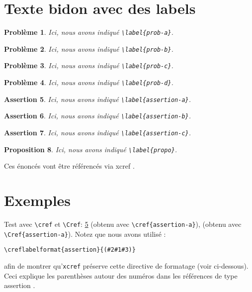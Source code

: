 \documentclass[french]{article}
\newtheorem{problem}{Problème}
\newtheorem{assertion}[problem]{Assertion}
\newtheorem{proposition}[problem]{Proposition}
\let\fxcref=\xcreffrenchwrapper
\begin{document}
\section{Texte bidon avec des labels}

\begin{problem}\label{prob-a}
Ici, nous avons indiqué \verb|\label{prob-a}|.
\end{problem}
\begin{problem}\label{prob-b}
Ici, nous avons indiqué \verb|\label{prob-b}|.
\end{problem}
\begin{problem}\label{prob-c}
Ici, nous avons indiqué \verb|\label{prob-c}|.
\end{problem}
\begin{problem}\label{prob-d}
Ici, nous avons indiqué \verb|\label{prob-d}|.
\end{problem}
\begin{assertion}\label{assertion-a}
Ici, nous avons indiqué \verb|\label{assertion-a}|.
\end{assertion}
\begin{assertion}\label{assertion-b}
Ici, nous avons indiqué \verb|\label{assertion-b}|.
\end{assertion}
\begin{assertion}\label{assertion-c}
Ici, nous avons indiqué \verb|\label{assertion-c}|.
\end{assertion}
\begin{proposition}\label{propo}
Ici, nous avons indiqué \verb|\label{propo}|.
\end{proposition}

Ces énoncés vont être référencés via \textsf{xcref} \fxcref{sec-exemples}.

\section{Exemples}
\label{sec-exemples}

Test avec \verb|\cref| et \verb|\Cref|: \cref{assertion-a} (obtenu avec
\verb|\cref{assertion-a}|),  (obtenu avec
\verb|\Cref{assertion-a}|). Notez que nous avons utilisé :
\begin{verbatim}
\creflabelformat{assertion}{(#2#1#3)}
\end{verbatim}
afin de montrer qu'\verb|xcref| préserve cette directive de formatage (voir
ci-dessous). Ceci explique les parenthèses autour des numéros dans les
références de type \og assertion \fg.
\end{document}
